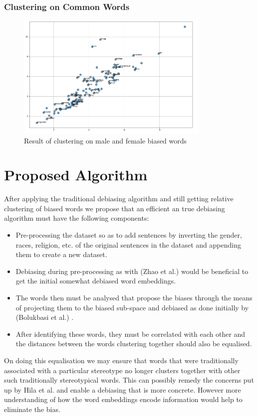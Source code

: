 \documentclass[12pt, a4paper]{article}
\begin{document}
				\subsubsection{Clustering on Common Words}
				\begin{figure}[H]
					\centerline{\includegraphics[width=25em]{debiased_misc.png}}
					\caption{Result of clustering on male and female biased words}
					\label{common-debias-fig}
				\end{figure}
			
	\section{Proposed Algorithm}
		After applying the traditional debiasing algorithm and still getting relative clustering of biased words we propose that an efficient an true debiasing algorithm must have the following components:
		\begin{itemize}
			\item Pre-processing the dataset so as to add sentences by inverting the gender, races, religion, etc. of the original sentences in the dataset and appending them to create a new dataset.
			\item Debiasing during pre-processing as with (Zhao et al.) \cite{3} would be beneficial to get the initial somewhat debiased word embeddings.
			\item  The words then must be analysed that propose the biases through the means of projecting them to the biased sub-space and debiased as done initially by (Bolukbasi et al.) \cite{2}.
			\item After identifying these words, they must be correlated with each other and the distances between the words clustering together should also be equalised.
		\end{itemize}
		On doing this equalisation we may ensure that words that were traditionally associated with a particular stereotype no longer clusters together with other such traditionally stereotypical words. This can possibly remedy the concerns put up by Hila et al. \cite{1} and enable a debiasing that is more concrete. However more understanding of how the word embeddings encode information would help to eliminate the bias.
		
\end{document}
